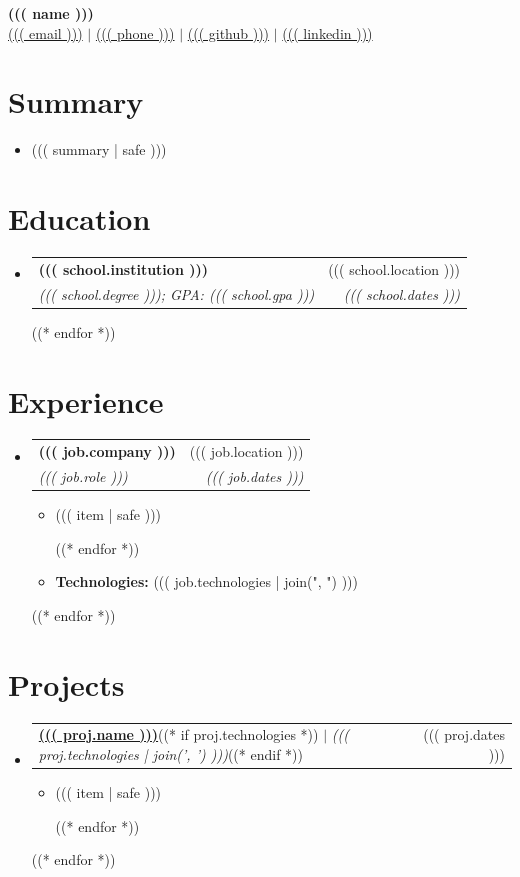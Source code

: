 \documentclass[letterpaper,11pt]{article}
\makeatletter
\newcommand{\resumeItem}[1]{
  \item\small{
    {#1 \vspace{-2pt}}
  }
}
\newcommand{\resumeSubheading}[4]{
  \vspace{-2pt}\item
    \begin{tabular*}{0.97\textwidth}[t]{l@{\extracolsep{\fill}}r}
      \textbf{#1} & #2 \\
      \textit{\small#3} & \textit{\small #4} \\
    \end{tabular*}\vspace{-7pt}
}
\newcommand{\resumeSubHeadingListStart}{\begin{itemize}[leftmargin=0.15in, label={}]}
\newcommand{\resumeSubHeadingListEnd}{\end{itemize}}
\newcommand{\resumeItemListStart}{\begin{itemize}}
\newcommand{\resumeItemListEnd}{\end{itemize}\vspace{-5pt}}
\newcommand{\technologies}[1]{
\noindent\textbf{Technologies:} #1
}
\newcommand{\resumeProjectHeading}[2]{
    \item
    \begin{tabular*}{0.97\textwidth}{l@{\extracolsep{\fill}}r}
      \small#1 & #2 \\
    \end{tabular*}\vspace{-7pt}
}
\makeatother
\begin{document}
\begin{center}
    {\LARGE \textbf{((( name )))}} \\[4pt]
    \normalsize
    \href{mailto:((( email )))}{((( email )))} $|$ 
    \href{tel:((( phone )))}{((( phone )))} $|$ 
    \href{((( "https://www." + github )))}{((( github )))} $|$ 
    \href{((( "https://www." + linkedin )))}{((( linkedin )))}

\end{center}

\section{Summary}
\resumeSubHeadingListStart
  \item\small
    ((( summary | safe ))) \\
\resumeSubHeadingListEnd

\section{Education}
  \resumeSubHeadingListStart
  ((* for school in education *))
    \resumeSubheading
      { ((( school.institution ))) }{ ((( school.location ))) }
      { ((( school.degree ))); GPA: ((( school.gpa ))) }{ ((( school.dates ))) }
    ((* endfor *))
  \resumeSubHeadingListEnd

\section{Experience}
  \resumeSubHeadingListStart
  ((* for job in work *))
    \resumeSubheading
      { ((( job.company ))) }{ ((( job.location ))) }
      { ((( job.role ))) }{ ((( job.dates ))) }
      \resumeItemListStart
      ((* for item in job.achievements *))
            \resumeItem{ ((( item | safe ))) }
      ((* endfor *))
      \resumeItem{ \technologies{((( job.technologies | join(", ") ))) } }
      \resumeItemListEnd
  ((* endfor *))
\resumeSubHeadingListEnd


\section{Projects}
\resumeSubHeadingListStart
((* for proj in projects *))
  \resumeProjectHeading
    {\href{ ((( proj.link ))) }{ \textbf{((( proj.name )))}}((* if proj.technologies *)) $|$ \emph{((( proj.technologies | join(', ') )))}((* endif *))}
    {((( proj.dates )))}
  \resumeItemListStart
    ((* for item in proj.description *))
    \resumeItem{((( item | safe )))}
    ((* endfor *))
  \resumeItemListEnd
((* endfor *))
\resumeSubHeadingListEnd
\end{document}

